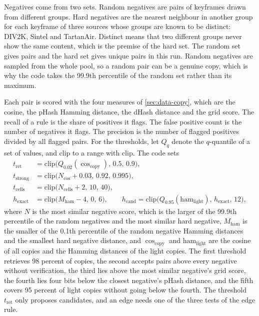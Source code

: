 Negatives come from two sets. Random negatives are pairs of keyframes drawn from different groups. Hard negatives are the nearest neighbour in another group for each keyframe of three sources whose groups are known to be distinct: DIV2K, Sintel and TartanAir. Distinct means that two different groups never show the same content, which is the premise of the hard set. The random set gives  pairs and the hard set gives  unique pairs in this run. Random negatives are sampled from the whole pool, so a random pair can be a genuine copy, which is why the code takes the 99.9th percentile of the random set rather than its maximum.

Each pair is scored with the four measures of \cref{sec:data-copy}, which are the cosine, the pHash Hamming distance, the dHash distance and the grid score. The recall of a rule is the share of positives it flags. The false positive count is the number of negatives it flags. The precision is the number of flagged positives divided by all flagged pairs. For the thresholds, let $Q_q$ denote the $q$-quantile of a set of values, and clip to a range with $\mathrm{clip}$. The code sets
\begin{align}
t_{\mathrm{ret}}&=\mathrm{clip}\big(Q_{0.02}(\cos_{\mathrm{copy}}),\,0.5,\,0.9\big),\label{eq:data-tret}\\
t_{\mathrm{strong}}&=\mathrm{clip}\big(N_{\cos}+0.03,\,0.92,\,0.995\big),\label{eq:data-tstrong}\\
t_{\mathrm{cells}}&=\mathrm{clip}\big(N_{\mathrm{cells}}+2,\,10,\,40\big),\label{eq:data-tcells}\\
h_{\mathrm{exact}}&=\mathrm{clip}\big(M_{\mathrm{ham}}-4,\,0,\,6\big),\qquad h_{\mathrm{cand}}=\mathrm{clip}\big(Q_{0.95}(\mathrm{ham}_{\mathrm{light}}),\,h_{\mathrm{exact}},\,12\big),\label{eq:data-thr}
\end{align}
where $N$ is the most similar negative score, which is the larger of the 99.9th percentile of the random negatives and the most similar hard negative, $M_{\mathrm{ham}}$ is the smaller of the 0.1th percentile of the random negative Hamming distances and the smallest hard negative distance, and $\cos_{\mathrm{copy}}$ and $\mathrm{ham}_{\mathrm{light}}$ are the cosine of all copies and the Hamming distances of the light copies. The first threshold retrieves 98 percent of copies, the second accepts pairs above every negative without verification, the third lies above the most similar negative's grid score, the fourth lies four bits below the closest negative's pHash distance, and the fifth covers 95 percent of light copies without going below the fourth. The threshold $t_{\mathrm{ret}}$ only proposes candidates, and an edge needs one of the three tests of the edge rule.

